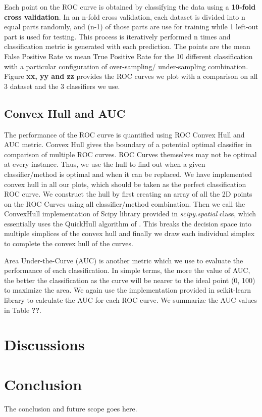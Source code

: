 \documentclass[10pt,journal,compsoc]{IEEEtran}
\begin{document}
Each point on the ROC curve is obtained by classifying the data using a \textbf{10-fold cross validation}.
In an n-fold cross validation, each dataset is divided into n equal parts randomly, and (n-1) of those parts are use for training while 1 left-out part is used for testing.
This process is iteratively performed n times and classification metric is generated with each prediction.
The points are the mean False Positive Rate vs mean True Positive Rate for the 10 different classification with a particular configuration of over-sampling/ under-sampling combination.
Figure \textbf{xx, yy and zz} provides the ROC curves we plot with a comparison on all 3 dataset and the 3 classifiers we use. 

\subsection{Convex Hull and AUC}
The performance of the ROC curve is quantified using ROC Convex Hull and AUC metric.
Convex Hull gives the boundary of a potential optimal classifier in comparison of multiple ROC curves.
ROC Curves themselves may not be optimal at every instance. 
Thus, we use the hull to find out when a given classifier/method is optimal and when it can be replaced.
We have implemented convex hull in all our plots, which should be taken as the perfect classification ROC curve.
We construct the hull by first creating an array of all the 2D points on the ROC Curves using all classifier/method combination.
Then we call the ConvexHull implementation of Scipy library \cite{scipy} provided in \textit{scipy.spatial} class, which essentially uses the QuickHull algorithm of \cite{qhull}.
This breaks the decision space into multiple simplices of the convex hull and finally we draw each individual simplex to complete the convex hull of the curves.

Area Under-the-Curve (AUC) is another metric which we use to evaluate the performance of each classification.
In simple terms, the more the value of AUC, the better the classification as the curve will be nearer to the ideal point (0, 100) to maximize the area.
We again use the implementation provided in scikit-learn library to calculate the AUC for each ROC curve.
We summarize the AUC values in Table \textbf{??}.

\section{Discussions}

\section{Conclusion}
The conclusion and future scope goes here.
\end{document}
